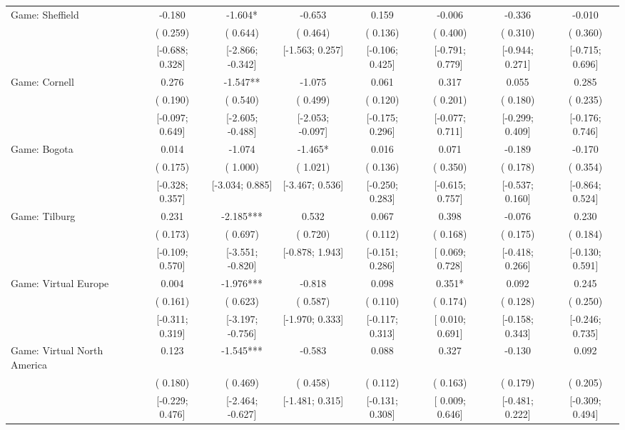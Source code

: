 \begin{tabular}{l*{7}{c}}
Game: Sheffield & -0.180 & -1.604* & -0.653 &  0.159 & -0.006 & -0.336 & -0.010 \\
                    & ( 0.259) & ( 0.644) & ( 0.464) & ( 0.136) & ( 0.400) & ( 0.310) & ( 0.360) \\
                    & [-0.688;  0.328] & [-2.866; -0.342] & [-1.563;  0.257] & [-0.106;  0.425] & [-0.791;  0.779] & [-0.944;  0.271] & [-0.715;  0.696] \\
Game: Cornell &  0.276 & -1.547** & -1.075 &  0.061 &  0.317 &  0.055 &  0.285 \\
                    & ( 0.190) & ( 0.540) & ( 0.499) & ( 0.120) & ( 0.201) & ( 0.180) & ( 0.235) \\
                    & [-0.097;  0.649] & [-2.605; -0.488] & [-2.053; -0.097] & [-0.175;  0.296] & [-0.077;  0.711] & [-0.299;  0.409] & [-0.176;  0.746] \\
Game: Bogota &  0.014 & -1.074 & -1.465* &  0.016 &  0.071 & -0.189 & -0.170 \\
                    & ( 0.175) & ( 1.000) & ( 1.021) & ( 0.136) & ( 0.350) & ( 0.178) & ( 0.354) \\
                    & [-0.328;  0.357] & [-3.034;  0.885] & [-3.467;  0.536] & [-0.250;  0.283] & [-0.615;  0.757] & [-0.537;  0.160] & [-0.864;  0.524] \\
Game: Tilburg &  0.231 & -2.185*** &  0.532 &  0.067 &  0.398 & -0.076 &  0.230 \\
                    & ( 0.173) & ( 0.697) & ( 0.720) & ( 0.112) & ( 0.168) & ( 0.175) & ( 0.184) \\
                    & [-0.109;  0.570] & [-3.551; -0.820] & [-0.878;  1.943] & [-0.151;  0.286] & [ 0.069;  0.728] & [-0.418;  0.266] & [-0.130;  0.591] \\
Game: Virtual Europe &  0.004 & -1.976*** & -0.818 &  0.098 &  0.351* &  0.092 &  0.245 \\
                    & ( 0.161) & ( 0.623) & ( 0.587) & ( 0.110) & ( 0.174) & ( 0.128) & ( 0.250) \\
                    & [-0.311;  0.319] & [-3.197; -0.756] & [-1.970;  0.333] & [-0.117;  0.313] & [ 0.010;  0.691] & [-0.158;  0.343] & [-0.246;  0.735] \\
Game: Virtual North America &  0.123 & -1.545*** & -0.583 &  0.088 &  0.327 & -0.130 &  0.092 \\
                    & ( 0.180) & ( 0.469) & ( 0.458) & ( 0.112) & ( 0.163) & ( 0.179) & ( 0.205) \\
                    & [-0.229;  0.476] & [-2.464; -0.627] & [-1.481;  0.315] & [-0.131;  0.308] & [ 0.009;  0.646] & [-0.481;  0.222] & [-0.309;  0.494] \\

\end{tabular}
